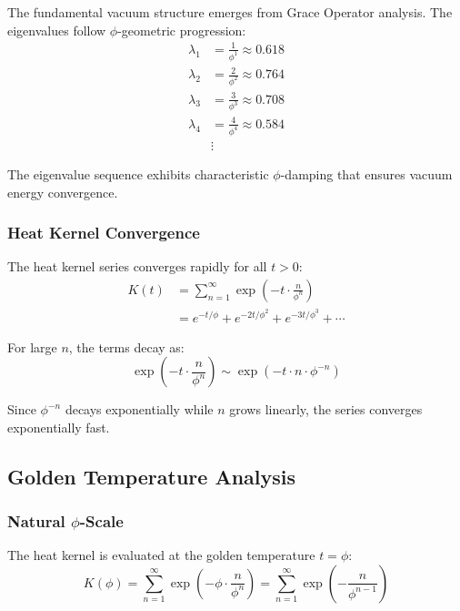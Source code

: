 The fundamental vacuum structure emerges from Grace Operator analysis. The eigenvalues follow $\phi$-geometric progression:
\begin{align}
\lambda_1 &= \frac{1}{\phi^1} \approx 0.618\\
\lambda_2 &= \frac{2}{\phi^2} \approx 0.764\\
\lambda_3 &= \frac{3}{\phi^3} \approx 0.708\\
\lambda_4 &= \frac{4}{\phi^4} \approx 0.584\\
&\vdots
\end{align}

The eigenvalue sequence exhibits characteristic $\phi$-damping that ensures vacuum energy convergence.

\subsubsection{Heat Kernel Convergence}

The heat kernel series converges rapidly for all $t > 0$:
\begin{align}
K(t) &= \sum_{n=1}^{\infty} \exp\left(-t \cdot \frac{n}{\phi^n}\right)\\
&= e^{-t/\phi} + e^{-2t/\phi^2} + e^{-3t/\phi^3} + \cdots
\end{align}

For large $n$, the terms decay as:
\begin{equation}
\exp\left(-t \cdot \frac{n}{\phi^n}\right) \sim \exp(-t \cdot n \cdot \phi^{-n})
\end{equation}

Since $\phi^{-n}$ decays exponentially while $n$ grows linearly, the series converges exponentially fast.

\subsection{Golden Temperature Analysis}

\subsubsection{Natural $\phi$-Scale}

The heat kernel is evaluated at the golden temperature $t = \phi$:
\begin{equation}
K(\phi) = \sum_{n=1}^{\infty} \exp\left(-\phi \cdot \frac{n}{\phi^n}\right) = \sum_{n=1}^{\infty} \exp\left(-\frac{n}{\phi^{n-1}}\right)
\end{equation}

